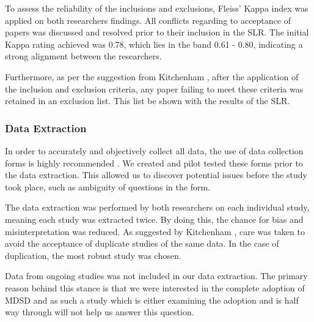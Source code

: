 \documentclass[10pt,twocolumn]{article}
\begin{document}

To assess the reliability of the inclusions and exclusions, Fleiss' Kappa index was applied on both researchers findings. All conflicts regarding to acceptance of papers was discussed and resolved prior to their inclusion in the SLR. The initial Kappa rating achieved was 0.78, which lies in the band 0.61 - 0.80, indicating a strong alignment between the researchers. 

Furthermore, as per the suggestion from Kitchenham \cite{kitchenham2007guidelines}, after the application of the inclusion and exclusion criteria, any paper failing to meet these criteria was retained in an exclusion list. This list be shown with the results of the SLR.


\subsubsection{Data Extraction}

In order to accurately and objectively collect all data, the use of data collection forms is highly recommended \cite{kitchenham2007guidelines}. We created and pilot tested these forms prior to the data extraction. This allowed us to discover potential issues before the study took place, such as ambiguity of questions in the form.

The data extraction was performed by both researchers on each individual study, meaning each study was extracted twice. By doing this, the chance for bias and misinterpretation was reduced. As suggested by Kitchenham \cite{kitchenham2007guidelines}, care was taken to avoid the acceptance of duplicate studies of the same data. In the case of duplication, the most robust study was chosen.

Data from ongoing studies was not included in our data extraction. The primary reason behind this stance is that we were interested in the complete adoption of MDSD and as such a study which is either examining the adoption and is half way through will not help us answer this question.
\end{document}
